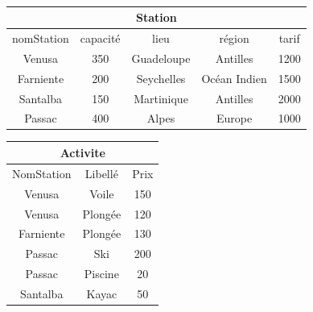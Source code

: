 






\begin{slide}
{\tt
\begin{center}
\begin{tabular}{|c|c|c|c|c|}\hline
\multicolumn{5}{|c|}{Station}\\\hline \hline
nomStation & capacit\'e & lieu & r\'egion & tarif \\ \hline
Venusa & 350 & Guadeloupe & Antilles & 1200 \\
Farniente & 200 & Seychelles & Oc\'ean Indien & 1500\\
Santalba & 150 & Martinique & Antilles & 2000 \\
Passac & 400 & Alpes & Europe & 1000 \\ \hline
\end{tabular}
\end{center}


\begin{center}
\begin{tabular}{|c|c|c|}\hline
\multicolumn{3}{|c|}{Activite}\\\hline \hline
NomStation & Libell\'e & Prix \\ \hline
Venusa & Voile & 150 \\
Venusa & Plong\'ee & 120 \\
Farniente & Plong\'ee & 130 \\
Passac & Ski  & 200 \\
Passac & Piscine  & 20 \\
Santalba & Kayac  & 50 \\ \hline
\end{tabular}
\end{center}
}
\end{slide}

